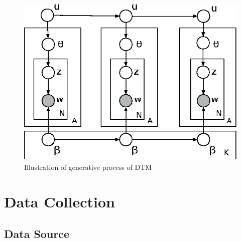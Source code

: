 \documentclass[DIV=calc, paper=letter, fontsize=10pt, twocolumn]{scrartcl}	 %
\begin{document}
\begin{figure}[!ht]
				\centerline{\includegraphics[scale = 0.8]{p113-blei.eps}}
				\caption{Illustration of generative process of DTM \cite{3}}
				\label{fig: DTM}
			\end{figure}

\section*{Data Collection}
\subsection*{Data Source}
\end{document}
